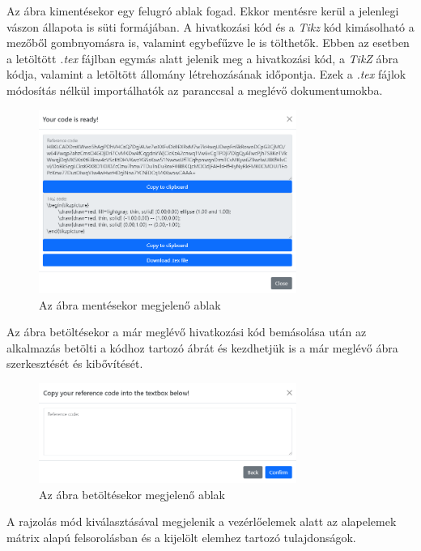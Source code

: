Az ábra kimentésekor egy felugró ablak fogad. Ekkor mentésre kerül a jelenlegi vászon állapota is süti formájában. A hivatkozási kód és a \textit{Tikz} kód kimásolható a mezőből gombnyomásra is, valamint egybefűzve le is tölthetők. Ebben az esetben a letöltött \textit{.tex} fájlban egymás alatt jelenik meg a hivatkozási kód, a \textit{TikZ} ábra kódja, valamint a letöltött állomány létrehozásának időpontja. Ezek a \textit{.tex} fájlok módosítás nélkül importálhatók az \lstinline[style=latex]{} paranccsal a meglévő dokumentumokba. 

\begin{figure}[!h]
	\label{fig:load}
	\centering
	\includegraphics[width=0.75\textwidth]{images/save_modal.png}
	\caption{Az ábra mentésekor megjelenő ablak}
\end{figure}

Az ábra betöltésekor a már meglévő hivatkozási kód bemásolása után az alkalmazás betölti a kódhoz tartozó ábrát és kezdhetjük is a már meglévő ábra szerkesztését és kibővítését.

\begin{figure}[!h]
	\label{fig:save}
	\centering
	\includegraphics[width=0.75\textwidth]{images/load_modal.png}
	\caption{Az ábra betöltésekor megjelenő ablak}
\end{figure}


A rajzolás mód kiválasztásával megjelenik a vezérlőelemek alatt az alapelemek mátrix alapú felsorolásban és a kijelölt elemhez tartozó tulajdonságok.

